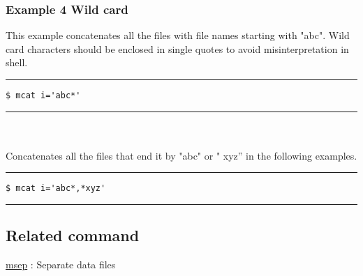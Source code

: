 \documentclass[a4paper]{jarticle}
\begin{document}
\subsubsection*{Example 4 Wild card}
This example concatenates all the files with file names starting with "abc". Wild card characters should be enclosed in single quotes to avoid misinterpretation in shell. \\

\hrule width 8cm
\begin{verbatim}
$ mcat i='abc*'
\end{verbatim}
\hrule width 8cm
\leavevmode \\ \\

Concatenates all the files that end it by "abc" or " xyz'' in the following examples.\\

\hrule width 8cm
\begin{verbatim}
$ mcat i='abc*,*xyz'
\end{verbatim}
\hrule width 8cm

\subsection*{Related command}

\hyperlink{msep.pdf}{msep} : Separate data files
\end{document}
